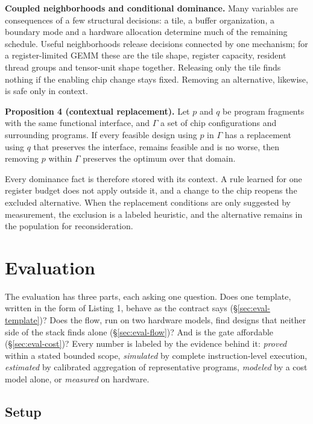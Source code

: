 \documentclass[11pt]{article}
\begin{document}
\textbf{Coupled neighborhoods and conditional dominance.} Many variables are consequences of a few structural decisions: a tile, a buffer organization, a boundary mode and a hardware allocation determine much of the remaining schedule. Useful neighborhoods release decisions connected by one mechanism; for a register-limited GEMM these are the tile shape, register capacity, resident thread groups and tensor-unit shape together. Releasing only the tile finds nothing if the enabling chip change stays fixed. Removing an alternative, likewise, is safe only in context.

\textbf{Proposition 4 (contextual replacement).} Let \(p\) and \(q\) be program fragments with the same functional interface, and \(\Gamma\) a set of chip configurations and surrounding programs. If every feasible design using \(p\) in \(\Gamma\) has a replacement using \(q\) that preserves the interface, remains feasible and is no worse, then removing \(p\) within \(\Gamma\) preserves the optimum over that domain.

Every dominance fact is therefore stored with its context. A rule learned for one register budget does not apply outside it, and a change to the chip reopens the excluded alternative. When the replacement conditions are only suggested by measurement, the exclusion is a labeled heuristic, and the alternative remains in the population for reconsideration.

\section{Evaluation}\label{sec:eval}

The evaluation has three parts, each asking one question. Does one template, written in the form of Listing 1, behave as the contract says (§\ref{sec:eval-template})? Does the flow, run on two hardware models, find designs that neither side of the stack finds alone (§\ref{sec:eval-flow})? And is the gate affordable (§\ref{sec:eval-cost})? Every number is labeled by the evidence behind it: \emph{proved} within a stated bounded scope, \emph{simulated} by complete instruction-level execution, \emph{estimated} by calibrated aggregation of representative programs, \emph{modeled} by a cost model alone, or \emph{measured} on hardware.

\subsection{Setup}\label{sec:setup}
\end{document}
